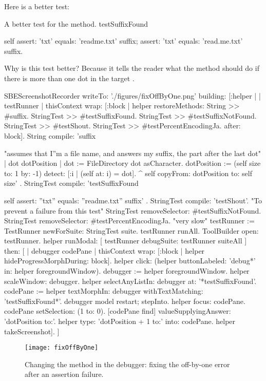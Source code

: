 \documentclass[a4paper,10pt,twoside]{book}
\begin{document}
Here is a better test:

\begin{method}[testSuffix2]{A better test for the  method.}
testSuffixFound

	self
		assert: 'txt' equals: 'readme.txt' suffix;
		assert: 'txt' equals: 'read.me.txt' suffix.
\end{method}
\noindent
Why is this test better?
Because it tells the reader what the method should do if there is more than one dot in the target .


\begin{ExecuteSmalltalkScript}
SBEScreenshotRecorder writeTo: './figures/fixOffByOne.png' building: [:helper |
	| testRunner |
	thisContext wrap: [:block | helper restoreMethods: {
			String >> #suffix.
			StringTest >> #testSuffixFound.
			StringTest >> #testSuffixNotFound.
			StringTest >> #testShout.
			StringTest >> #testPercentEncodingJa. }
		after: block].
	String compile: 'suffix

"assumes that I''m a file name, and answers my suffix, the part after the last dot"
| dot dotPosition |
dot := FileDirectory dot asCharacter.
dotPosition := (self size to: 1 by: -1) detect: [:i | (self at: i) = dot].
^ self copyFrom: dotPosition to: self size'
.
	StringTest compile: 'testSuffixFound

self assert: ''txt'' equals: ''readme.txt'' suffix'
.
	StringTest compile: 'testShout'. "To prevent a failure from this test"
	StringTest removeSelector: #testSuffixNotFound.
	StringTest removeSelector: #testPercentEncodingJa. "very slow"
	testRunner := TestRunner newForSuite: StringTest suite.
	testRunner runAll.
	ToolBuilder open: testRunner.
	helper
		runModal: [ testRunner debugSuite: testRunner suiteAll ]
		then: [
			| debugger codePane |
			thisContext wrap: [:block | helper hideProgressMorphDuring: block].
			helper click: (helper buttonLabeled: 'debug*' in: helper foregroundWindow).
			debugger := helper foregroundWindow.
			helper scaleWindow: debugger.
			helper selectAnyListIn: debugger at: '*testSuffixFound'.
			codePane := helper textMorphIn: debugger withTextMatching: 'testSuffixFound*'.
			debugger model restart; stepInto.
			helper focus: codePane.
			codePane setSelection: (1 to: 0).
			[codePane find]
				valueSupplyingAnswer: 'dotPosition to:'.
			helper type: 'dotPosition + 1 to:' into: codePane.
			helper takeScreenshot].
]
\end{ExecuteSmalltalkScript}
\begin{figure}[btp]
	\begin{center}
		\texttt{[image: fixOffByOne]}
	\end{center}
	\caption{Changing the  method in the debugger: fixing the off-by-one error after an \sunit assertion failure.}
	\label{fig:fixOffByOne}
\end{figure}
\end{document}
